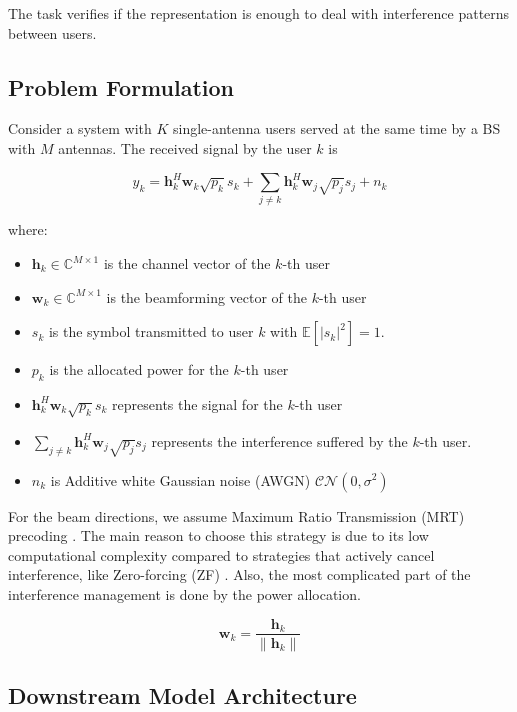 The task verifies if the representation is enough to deal with interference patterns between users.

\subsection{Problem Formulation}\label{sec:task_power_problem}

Consider a system with $K$ single-antenna users served at the same time by a BS with $M$ antennas. The received signal by the user $k$ is

\begin{equation}
    y_k = \mathbf{h}_k^H \mathbf{w}_k \sqrt{p_k} s_k + \sum_{j \neq k} \mathbf{h}_k^H \mathbf{w}_j \sqrt{p_j} s_j + n_k
\end{equation}

where:
\begin{itemize}
    \item $\mathbf{h}_k \in \mathbb{C}^{M \times 1}$ is the channel vector of the $k$-th user
    \item $\mathbf{w}_k \in \mathbb{C}^{M \times 1}$ is the beamforming vector of the $k$-th user
    \item $s_k$ is the symbol transmitted to user $k$ with $\mathbb{E} [|s_k|^2] = 1$.
    \item $p_k$ is the allocated power for the $k$-th user
    \item $\mathbf{h}_k^H \mathbf{w}_k \sqrt{p_k} s_k$ represents the signal for the $k$-th user
    \item $\sum_{j \neq k} \mathbf{h}_k^H \mathbf{w}_j \sqrt{p_j} s_j $ represents the interference suffered by the $k$-th user.
    \item $n_k$ is Additive white Gaussian noise (AWGN) $\mathcal{CN}(0, \sigma^2)$
\end{itemize}

For the beam directions, we assume Maximum Ratio Transmission (MRT) precoding \cite{mrt1999}. The main reason to choose this strategy is due to its low computational complexity compared to strategies that actively cancel interference, like Zero-forcing (ZF) \cite{spencer2004zf}. Also, the most complicated part of the interference management is done by the power allocation.

\begin{equation}
    \mathbf{w}_k = \frac{\mathbf{h}_k}{\| \mathbf{h}_k \|}
\end{equation}

\subsection{Downstream Model Architecture}\label{sec:task_power_model}

